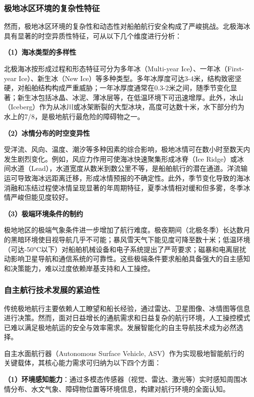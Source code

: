 \documentclass[12pt,a4paper]{ctexbook}
\begin{document}
\subsubsection{极地冰区环境的复杂性特征}

然而，极地冰区环境的复杂性和动态性对船舶航行安全构成了严峻挑战。北极海冰具有显著的时空异质性特征，可从以下几个维度进行分析：

\textbf{（1）海冰类型的多样性}

北极海冰按形成过程和形态特征可分为多年冰（Multi-year Ice）、一年冰（First-year Ice）、新生冰（New Ice）等多种类型。多年冰厚度可达3-4米，结构致密坚硬，对船舶结构构成严重威胁；一年冰厚度通常在0.3-2米之间，随季节变化显著；新生冰包括冰晶、冰泥、薄冰层等，在低温环境下可迅速增厚。此外，冰山（Iceberg）作为从冰川或冰架断裂的大型冰块，高度可达数十米，水下部分约为水上的7/8，是极地航行最危险的障碍物之一。

\textbf{（2）冰情分布的时空变异性}

受洋流、风向、温度、潮汐等多种因素的综合影响，极地冰情可在数小时至数天内发生剧烈变化。例如，风应力作用可使海冰快速聚集形成冰脊（Ice Ridge）或冰间水道（Lead），水道宽度从数米到数公里不等，是船舶航行的潜在通道。洋流输运可导致海冰远距离迁移，形成冰情预报的不确定性。此外，季节变化导致的海冰消融和冻结过程使冰情呈现显著的年周期特征，夏季冰情相对缓和但多雾，冬季冰情严峻但能见度较好。

\textbf{（3）极端环境条件的制约}

极地地区的极端气象条件进一步增加了航行难度。极夜期间（北极冬季）长达数月的黑暗环境使目视导航几乎不可能；暴风雪天气下能见度可降至数十米；低温环境（可达-50°C以下）对船舶机械设备和电子系统提出了严苛要求；磁暴和电离层扰动影响卫星导航和通信系统的可靠性。这些极端条件要求船舶具备强大的自主感知和决策能力，难以过度依赖岸基支持和人工操控。

\subsubsection{自主航行技术发展的紧迫性}

传统极地航行主要依赖人工瞭望和船长经验，通过雷达、卫星图像、冰情图等信息进行决策。然而，面对日益增长的通航需求和日益复杂的航行环境，人工操控模式已难以满足极地航运的安全与效率需求。发展智能化的自主导航技术成为必然选择。

自主水面航行器（Autonomous Surface Vehicle, ASV）作为实现极地智能航行的关键载体，其核心能力需求可归纳为以下四个方面：

\textbf{（1）环境感知能力}：通过多模态传感器（视觉、雷达、激光等）实时感知周围冰情分布、水文气象、障碍物位置等环境信息，构建对航行环境的全面认知。
\end{document}
